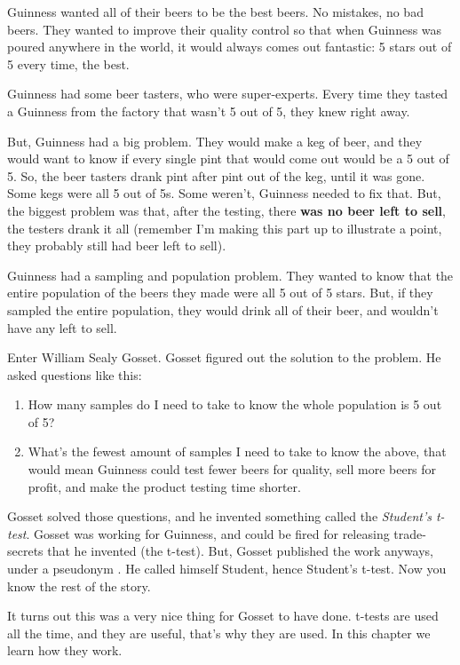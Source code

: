 \documentclass[
]{book}
\begin{document}
Guinness wanted all of their beers to be the best beers. No mistakes, no bad beers. They wanted to improve their quality control so that when Guinness was poured anywhere in the world, it would always comes out fantastic: 5 stars out of 5 every time, the best.

Guinness had some beer tasters, who were super-experts. Every time they tasted a Guinness from the factory that wasn't 5 out of 5, they knew right away.

But, Guinness had a big problem. They would make a keg of beer, and they would want to know if every single pint that would come out would be a 5 out of 5. So, the beer tasters drank pint after pint out of the keg, until it was gone. Some kegs were all 5 out of 5s. Some weren't, Guinness needed to fix that. But, the biggest problem was that, after the testing, there \textbf{was no beer left to sell}, the testers drank it all (remember I'm making this part up to illustrate a point, they probably still had beer left to sell).

Guinness had a sampling and population problem. They wanted to know that the entire population of the beers they made were all 5 out of 5 stars. But, if they sampled the entire population, they would drink all of their beer, and wouldn't have any left to sell.

Enter William Sealy Gosset. Gosset figured out the solution to the problem. He asked questions like this:

\begin{enumerate}
\def\labelenumi{\arabic{enumi}.}
\item
  How many samples do I need to take to know the whole population is 5 out of 5?
\item
  What's the fewest amount of samples I need to take to know the above, that would mean Guinness could test fewer beers for quality, sell more beers for profit, and make the product testing time shorter.
\end{enumerate}

Gosset solved those questions, and he invented something called the \emph{Student's t-test}. Gosset was working for Guinness, and could be fired for releasing trade-secrets that he invented (the t-test). But, Gosset published the work anyways, under a pseudonym \citep{Student1908}. He called himself Student, hence Student's t-test. Now you know the rest of the story.

It turns out this was a very nice thing for Gosset to have done. t-tests are used all the time, and they are useful, that's why they are used. In this chapter we learn how they work.
\end{document}
